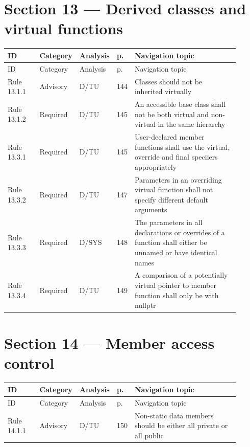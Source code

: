 \documentclass[10pt,letterpaper]{article}
\begin{document}
\section{Section 13 --- Derived classes and virtual functions}
\small\setlength{\tabcolsep}{3pt}\renewcommand{\arraystretch}{1.15}
\begin{longtable}{p{0.14\linewidth}p{0.14\linewidth}p{0.1\linewidth}p{0.045\linewidth}p{0.475\linewidth}}
\toprule
ID & Category & Analysis & p. & Navigation topic\\ \midrule
\endfirsthead
\toprule
ID & Category & Analysis & p. & Navigation topic\\ \midrule
\endhead
Rule 13.1.1 & Advisory & D/TU & 144 & Classes should not be inherited virtually\\
Rule 13.1.2 & Required & D/TU & 145 & An accessible base class shall not be both virtual and non-virtual in the same hierarchy\\
Rule 13.3.1 & Required & D/TU & 145 & User-declared member functions shall use the virtual, override and final speciiers appropriately\\
Rule 13.3.2 & Required & D/TU & 147 & Parameters in an overriding virtual function shall not specify different default arguments\\
Rule 13.3.3 & Required & D/SYS & 148 & The parameters in all declarations or overrides of a function shall either be unnamed or have identical names\\
Rule 13.3.4 & Required & D/TU & 149 & A comparison of a potentially virtual pointer to member function shall only be with nullptr\\
\bottomrule
\end{longtable}
\normalsize

\section{Section 14 --- Member access control}
\small\setlength{\tabcolsep}{3pt}\renewcommand{\arraystretch}{1.15}
\begin{longtable}{p{0.14\linewidth}p{0.14\linewidth}p{0.1\linewidth}p{0.045\linewidth}p{0.475\linewidth}}
\toprule
ID & Category & Analysis & p. & Navigation topic\\ \midrule
\endfirsthead
\toprule
ID & Category & Analysis & p. & Navigation topic\\ \midrule
\endhead
Rule 14.1.1 & Advisory & D/TU & 150 & Non-static data members should be either all private or all public\\
\bottomrule
\end{longtable}
\normalsize
\end{document}
